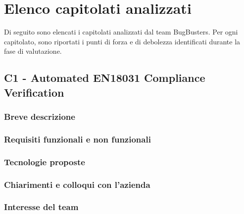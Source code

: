 \documentclass[a4paper,11pt]{article}
\begin{document}
\section{Elenco capitolati analizzati}
Di seguito sono elencati i capitolati analizzati dal team BugBusters. Per ogni capitolato, sono riportati i punti di forza e di debolezza identificati durante la fase di valutazione.

\subsection{C1 - Automated EN18031 Compliance Verification}
\subsubsection{Breve descrizione}
\subsubsection{Requisiti funzionali e non funzionali}
\subsubsection{Tecnologie proposte}
\subsubsection{Chiarimenti e colloqui con l'azienda}
\subsubsection{Interesse del team}
\end{document}
